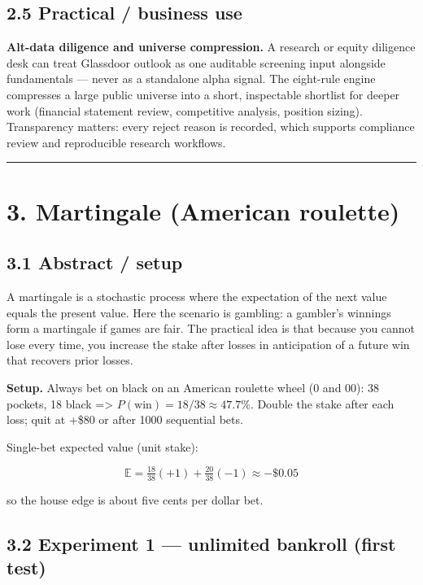 \documentclass[
  11pt,
]{article}
\begin{document}
\subsection{2.5 Practical / business use}\label{practical-business-use}

\textbf{Alt-data diligence and universe compression.} A research or
equity diligence desk can treat Glassdoor outlook as one auditable
screening input alongside fundamentals --- never as a standalone alpha
signal. The eight-rule engine compresses a large public universe into a
short, inspectable shortlist for deeper work (financial statement
review, competitive analysis, position sizing). Transparency matters:
every reject reason is recorded, which supports compliance review and
reproducible research workflows.

\begin{center}\rule{0.5\linewidth}{0.5pt}\end{center}

\section{3. Martingale (American
roulette)}\label{martingale-american-roulette}

\subsection{3.1 Abstract / setup}\label{abstract-setup}

A martingale is a stochastic process where the expectation of the next
value equals the present value. Here the scenario is gambling: a
gambler's winnings form a martingale if games are fair. The practical
idea is that because you cannot lose every time, you increase the stake
after losses in anticipation of a future win that recovers prior losses.

\textbf{Setup.} Always bet on black on an American roulette wheel (0 and
00): 38 pockets, 18 black =\textgreater{}
\(P(\text{win}) = 18/38 \approx 47.7\%\). Double the stake after each
loss; quit at +\$80 or after 1000 sequential bets.

Single-bet expected value (unit stake):

\[
\mathbb{E} = \tfrac{18}{38}(+1) + \tfrac{20}{38}(-1) \approx -\$0.05
\]

so the house edge is about five cents per dollar bet.

\subsection{3.2 Experiment 1 --- unlimited bankroll (first
test)}\label{experiment-1-unlimited-bankroll-first-test}
\end{document}
